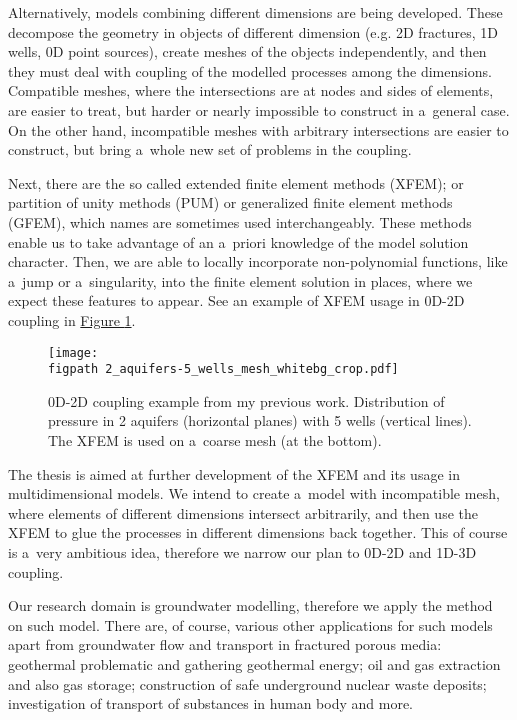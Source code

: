 \documentclass[dvipsnames,FM,Dis]{tulthesis}
\newcommand{\fig}[1]{\hyperref[#1]{Figure \ref{#1}}}
\newcommand{\figpath}{figures/}
\begin{document}
Alternatively, models combining different dimensions are being developed. These decompose the geometry
in objects of different dimension (e.g. 2D fractures, 1D wells, 0D point sources), create meshes of the objects independently,
and then they must deal with coupling of the modelled processes among the dimensions. 
Compatible meshes, where the intersections are at nodes and sides of elements, are easier to treat, but harder
or nearly impossible to construct in a~general case. On the other hand, incompatible meshes with arbitrary intersections are easier to construct, 
but bring a~whole new set of problems in the coupling.

Next, there are the so called extended finite element methods (XFEM); or partition of unity methods (PUM) or generalized
finite element methods (GFEM), which names are sometimes used interchangeably. 
These methods enable us to take advantage of an a~priori knowledge of the model solution character.
Then, we are able to locally incorporate non-polynomial functions, like a~jump or a~singularity, into the finite element solution
 in places, where we expect these features to appear. See an example of XFEM usage in 0D-2D coupling in \fig{fig:aquifers}.
\begin{figure}[!htb]
  \centering    
    \texttt{[image: \\figpath 2\_aquifers-5\_wells\_mesh\_whitebg\_crop.pdf]}
  \caption{0D-2D coupling example from my previous work. Distribution of pressure in 2 aquifers (horizontal planes) with 5 wells 
          (vertical lines). The XFEM is used on a~coarse mesh (at the bottom). }
  \label{fig:aquifers}
\end{figure}

The thesis is aimed at further development of the XFEM and its usage in multidimensional models. 
We intend to create a~model with incompatible mesh, where elements of different dimensions intersect
arbitrarily, and then use the XFEM to glue the processes in different dimensions back together. 
This of course is a~very ambitious idea, therefore we narrow our plan to 0D-2D and 1D-3D coupling. 

Our research domain is groundwater modelling, therefore we apply the method on such model.
There are, of course, various other applications for such models apart from groundwater flow and transport in fractured porous media:
geothermal problematic and gathering geothermal energy; oil and gas extraction and also gas storage;
construction of safe underground nuclear waste deposits; investigation of transport of substances in human body
and more.
\end{document}
